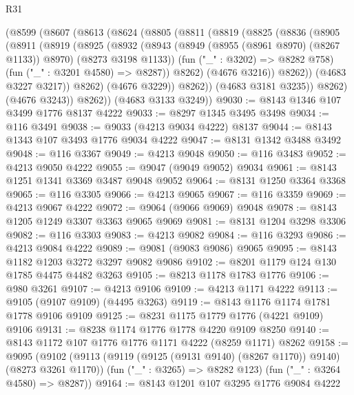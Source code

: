 \begin{lexlean}{R31}
\begin{coremodule}
        (@8599
          (@8607
            (@8613
              (@8624
                (@8805
                  (@8811
                    (@8819
                      (@8825
                        (@8836
                          (@8905
                            (@8911
                              (@8919
                                (@8925
                                  (@8932
                                    (@8943
                                      (@8949 (@8955 (@8961 @8970) (@8267 @1133)) @8970)
                                      (@8273 @3198 @1133))
                                    (fun ("_" : @3202) => @8282 @758)
                                    (fun ("_" : @3201 @4580) => @8287))
                                  @8262)
                                (@4676 @3216))
                              @8262))
                          (@4683 @3227 @3217))
                        @8262)
                      (@4676 @3229))
                    @8262))
                (@4683 @3181 @3235))
              @8262)
            (@4676 @3243))
          @8262))
      (@4683 @3133 @3249))
@9030 := @8143 @1346 @107 @3499 @1776 @8137 @4222
@9033 := @8297 @1345 @3495 @3498
@9034 := @116 @3491
@9038 := @9033 (@4213 @9034 @4222) @8137
@9044 := @8143 @1343 @107 @3493 @1776 @9034 @4222
@9047 := @8131 @1342 @3488 @3492
@9048 := @116 @3367
@9049 := @4213 @9048
@9050 := @116 @3483
@9052 := @4213 @9050 @4222
@9055 := @9047 (@9049 @9052) @9034
@9061 := @8143 @1251 @1341 @3369 @3487 @9048 @9052
@9064 := @8131 @1250 @3364 @3368
@9065 := @116 @3305
@9066 := @4213 @9065
@9067 := @116 @3359
@9069 := @4213 @9067 @4222
@9072 := @9064 (@9066 @9069) @9048
@9078 := @8143 @1205 @1249 @3307 @3363 @9065 @9069
@9081 := @8131 @1204 @3298 @3306
@9082 := @116 @3303
@9083 := @4213 @9082
@9084 := @116 @3293
@9086 := @4213 @9084 @4222
@9089 := @9081 (@9083 @9086) @9065
@9095 := @8143 @1182 @1203 @3272 @3297 @9082 @9086
@9102 := @8201 @1179 @124 @130 @1785 @4475 @4482 @3263
@9105 := @8213 @1178 @1783 @1776
@9106 := @980 @3261
@9107 := @4213 @9106
@9109 := @4213 @1171 @4222
@9113 := @9105 (@9107 @9109) (@4495 @3263)
@9119 := @8143 @1176 @1174 @1781 @1778 @9106 @9109
@9125 := @8231 @1175 @1779 @1776 (@4221 @9109) @9106
@9131 := @8238 @1174 @1776 @1778 @4220 @9109 @8250
@9140 := @8143 @1172 @107 @1776 @1776 @1171 @4222 (@8259 @1171) @8262
@9158 := @9095
    (@9102
      (@9113 (@9119 (@9125 (@9131 @9140) (@8267 @1170)) @9140) (@8273 @3261 @1170))
      (fun ("_" : @3265) => @8282 @123)
      (fun ("_" : @3264 @4580) => @8287))
@9164 := @8143 @1201 @107 @3295 @1776 @9084 @4222

\end{coremodule}
\end{lexlean}
